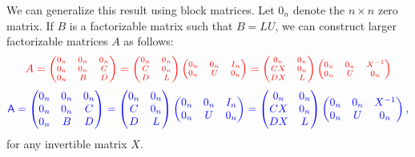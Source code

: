 \documentclass[10pt,twoside]{siamart1116}
\numberwithin{theorem}{section}
\providecommand{\DIFadd}[1]{{\protect\color{blue} \sf #1}} %
\providecommand{\DIFdel}[1]{{\protect\color{red} \scriptsize #1}} %
\providecommand{\DIFaddbegin}{} %
\providecommand{\DIFaddend}{} %
\providecommand{\DIFdelbegin}{} %
\providecommand{\DIFdelend}{} %
\begin{document}
We can generalize this result using block matrices. Let $0_n$ denote the $n \times n$ zero matrix. If $B$ is a factorizable matrix such that $B=LU$, we can construct larger factorizable matrices $A$ as follows:
\DIFdelbegin \[
	\DIFdel{A = \begin{pmatrix}
		0_n & 0_n & 0_n \\
		0_n & 0_n & C   \\
		0_n & B   & D
	\end{pmatrix}
	=
	\begin{pmatrix}
		0_n & 0_n \\
		C   & 0_n \\
		D   & L
	\end{pmatrix}
	\begin{pmatrix}
		0_n & 0_n & I_n \\
		0_n & U   & 0_n
	\end{pmatrix}
	=
	\begin{pmatrix}
		0_n & 0_n \\
		CX  & 0_n \\
		DX  & L
	\end{pmatrix}
	\begin{pmatrix}
		0_n & 0_n & X^{-1} \\
		0_n & U   & 0_n
	\end{pmatrix}
}\]%
\DIFdelend \DIFaddbegin \[
  \DIFadd{A =
  \begin{pmatrix}
    0_n & 0_n & 0_n \\
    0_n & 0_n & C   \\
    0_n & B   & D
  \end{pmatrix}
  =
  \begin{pmatrix}
    0_n & 0_n \\
    C   & 0_n \\
    D   & L
  \end{pmatrix}
  \begin{pmatrix}
    0_n & 0_n & I_n \\
    0_n & U   & 0_n
  \end{pmatrix}
  =
  \begin{pmatrix}
    0_n & 0_n \\
    CX  & 0_n \\
    DX  & L
  \end{pmatrix}
  \begin{pmatrix}
    0_n & 0_n & X^{-1} \\
    0_n & U   & 0_n
  \end{pmatrix},
}\]\DIFaddend 
for any invertible matrix $X$.
\end{document}
